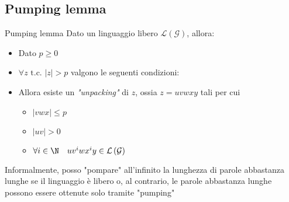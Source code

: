 \subsection{Pumping lemma}\label{pumping lemma}
\begin{teorema}{Pumping lemma}
	Dato un linguaggio libero $ \mathcal{L}\left(\mathcal{G}\right) $, allora:
	\begin{itemize}
		\item Dato $ p \ge 0 $
		\item $ \forall z \text{ t.c. } \left|z\right| > p $ valgono le seguenti condizioni:
		\item Allora esiste un \textit{"unpacking"} di $ z $, ossia $ z = uvwxy $ tali per cui
		      \begin{itemize}
			      \item $ \left|vwx\right| \le p $
			      \item $ \left|uv\right| > 0$
			      \item $ \forall i \in \N \quad u v^{i}w x^{i}y \in \mathcal{L}\left(\mathcal{G}\right) $
		      \end{itemize}
	\end{itemize}
\end{teorema}
Informalmente, posso "pompare" all'infinito la lunghezza di parole abbastanza lunghe se il linguaggio è libero o, al contrario, le parole abbastanza lunghe possono essere ottenute solo tramite "pumping"

